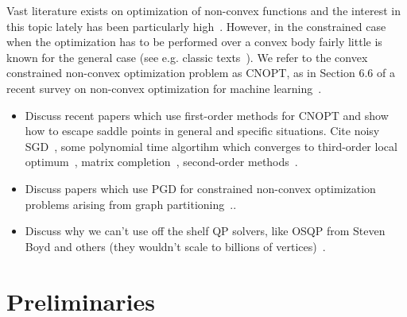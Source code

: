 Vast literature exists on optimization of non-convex functions and the interest in this topic lately has been particularly high~\cite{}. However, in the constrained case when the optimization has to be performed over a convex body fairly little is known for the general case (see e.g. classic texts~\cite{B99,WN99,BV04}). We refer to the convex constrained non-convex optimization problem as CNOPT, as in Section 6.6 of a recent survey on non-convex optimization for machine learning~\cite{JK17}.

\begin{itemize}
\item Discuss recent papers which use first-order methods for CNOPT and show how to escape saddle points in general and specific situations. Cite noisy SGD~\cite{GHJY15}, some polynomial time algortihm which converges to third-order local optimum~\cite{AG16}, matrix completion~\cite{GLM16}, second-order methods~\cite{SQW15}.
\item Discuss papers which use PGD for constrained non-convex optimization problems arising from graph partitioning~\cite{LRSST10}..
\item Discuss why we can't use off the shelf QP solvers, like OSQP from Steven Boyd and others (they wouldn't scale to billions of vertices)~\cite{SBGBB17}.
\end{itemize}




\section{Preliminaries}\label{sec:mdbgp-definitions}


